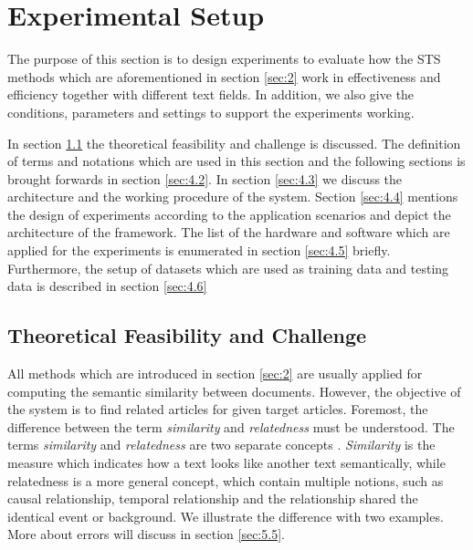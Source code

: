 \section{Experimental Setup}
\label{sec:4}

The purpose of this section is to design experiments to evaluate how the STS methods which are aforementioned in section \ref{sec:2} work in effectiveness and efficiency together with different text fields. In addition, we also give the conditions, parameters and settings to support the experiments working. 

In section \ref{sec:4.1} the theoretical feasibility and challenge is discussed. The definition of terms and notations which are used in this section and the following sections is brought forwards in section \ref{sec:4.2}. In section \ref{sec:4.3} we discuss the architecture and the working procedure of the system. Section \ref{sec:4.4} mentions the design of experiments according to the application scenarios and depict the architecture of the framework. The list of the hardware and software which are applied for the experiments is enumerated in section \ref{sec:4.5} briefly. Furthermore, the setup of datasets which are used as training data and testing data is described in section \ref{sec:4.6}

\subsection{Theoretical Feasibility and Challenge}
\label{sec:4.1}

All methods which are introduced in section \ref{sec:2} are usually applied for computing the semantic similarity between documents. However, the objective of the system is to find related articles for given target articles. Foremost, the difference between the term \textit{similarity} and \textit{relatedness} must be understood. The terms \textit{similarity} and \textit{relatedness} are two separate concepts \cite{pedersen2007measures}. \textit{Similarity} is the measure which indicates how a text looks like another text semantically, while relatedness is a more general concept, which contain multiple notions, such as causal relationship, temporal relationship and the relationship shared the identical event or background. We illustrate the difference with two examples. More about errors will discuss in section \ref{sec:5.5}. 


